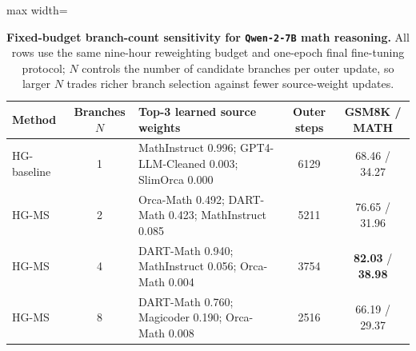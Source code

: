 \documentclass{article}
\theoremstyle{normaltheorem}
\begin{document}
\begin{table}[t]
  \centering
  \caption{\textbf{Fixed-budget branch-count sensitivity for \texttt{Qwen-2-7B} math reasoning.}
  All rows use the same nine-hour reweighting budget and one-epoch final fine-tuning protocol; \(N\) controls the number of candidate branches per outer update, so larger \(N\) trades richer branch selection against fewer source-weight updates.}
  \label{tab:llm-branch-ablation-qwen}
  \begin{adjustbox}{max width=\textwidth}
  \begin{tabular}{lclcc}
    \toprule
    Method & Branches \(N\) & Top-3 learned source weights & Outer steps & GSM8K / MATH \\
    \midrule
    HG-baseline & 1 & MathInstruct 0.996; GPT4-LLM-Cleaned 0.003; SlimOrca 0.000 & 6129 & 68.46 / 34.27 \\
    HG-MS       & 2 & Orca-Math 0.492; DART-Math 0.423; MathInstruct 0.085 & 5211 & 76.65 / 31.96 \\
    HG-MS       & 4 & DART-Math 0.940; MathInstruct 0.056; Orca-Math 0.004 & 3754 & \textbf{82.03} / \textbf{38.98} \\
    HG-MS       & 8 & DART-Math 0.760; Magicoder 0.190; Orca-Math 0.008 & 2516 & 66.19 / 29.37 \\
    \bottomrule
  \end{tabular}
  \end{adjustbox}
  
\end{table}
\end{document}
